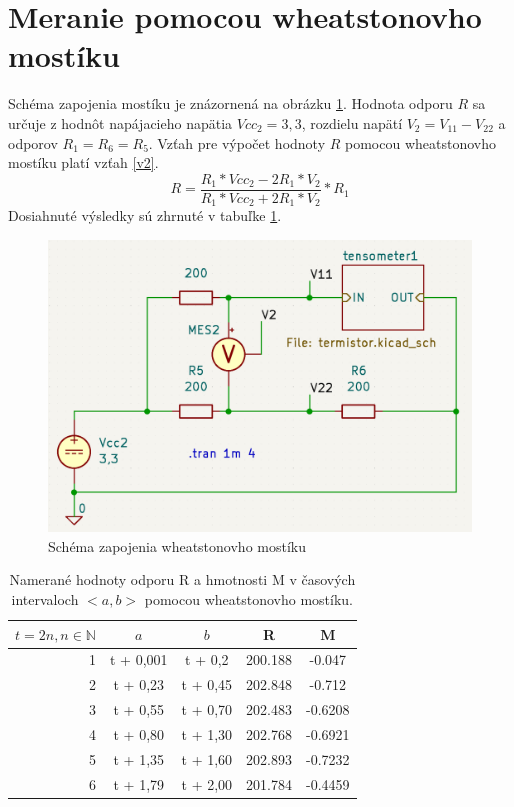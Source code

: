 \section{Meranie pomocou wheatstonovho mostíku}
\label{b}
Schéma zapojenia mostíku je znázornená na obrázku \ref{fig:2}. Hodnota odporu $R$ sa určuje z hodnôt napájacieho napätia $Vcc_2 = 3,3$, rozdielu napätí $V_2 = V_{11} - V_{22}$ a odporov $R_1 = R_6 = R_5$. Vzťah pre výpočet hodnoty $R$ pomocou wheatstonovho mostíku platí vzťah \ref{v2}. 
\begin{equation}
    \label{v2}
    R = \frac{R_1*Vcc_2-2R_1*V_2}{R_1*Vcc_2+2R_1*V_2}*R_1
\end{equation}
Dosiahnuté výsledky sú zhrnuté v tabuľke \ref{t2}.
\begin{figure}[H]
    \centering
    \includegraphics[width=0.7\linewidth]{fig/dva.png}
    \caption{Schéma zapojenia wheatstonovho mostíku}
    \label{fig:2}
\end{figure}
\begin{table}[H]
    \centering
    \begin{tabular}{|r|c|c|c|c|}
        \hline
         $t = 2n , n \in \mathbb{N}$ &  $a$ &  $b$ & R &M\\
        \hline
         1&  t + 0,001&  t + 0,2& 200.188&-0.047\\
        \hline
         2&  t + 0,23&  t + 0,45& 202.848&-0.712\\
        \hline
         3&  t + 0,55&  t + 0,70& 202.483&-0.6208\\
        \hline
         4&  t + 0,80&  t + 1,30& 202.768&-0.6921\\
        \hline
         5&  t + 1,35&  t + 1,60& 202.893&-0.7232\\
        \hline
         6&  t + 1,79&  t + 2,00& 201.784&-0.4459\\
        \hline
    \end{tabular}
    \caption{Namerané hodnoty odporu R a hmotnosti M v časových intervaloch $<a,b>$ pomocou wheatstonovho mostíku.}
    \label{t2}
\end{table}
